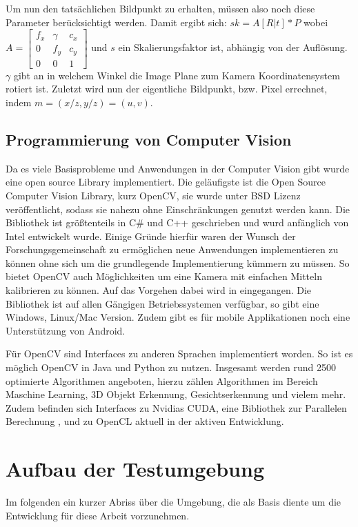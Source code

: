 Um nun den tatsächlichen Bildpunkt zu erhalten, müssen also noch diese Parameter berücksichtigt werden. Damit ergibt sich:
$sk = A [R | t] * P 
$
wobei $A = \begin{bmatrix} f_x & \gamma & c_x \\
                             0 &  f_y   & c_y \\
                             0 &  0     &  1\end{bmatrix}$ und $s$ ein Skalierungsfaktor ist, abhängig von der Auflösung. $\gamma$ gibt an in welchem Winkel die Image Plane zum Kamera Koordinatensystem rotiert ist. Zuletzt wird nun der eigentliche Bildpunkt, bzw. Pixel errechnet, indem $m=(x/z, y/z)=(u,v)$.



\subsection{Programmierung von Computer Vision}
\label{sec:opencv}
Da es viele Basisprobleme und Anwendungen in der Computer Vision gibt wurde eine open source Library implementiert. Die geläufigste ist die Open Source Computer Vision Library, kurz OpenCV, sie wurde unter BSD Lizenz veröffentlicht, sodass sie nahezu ohne Einschränkungen genutzt werden kann. Die Bibliothek ist größtenteils in C\# und C++  geschrieben und wurd anfänglich von Intel entwickelt wurde. \textbf{\autocite[512--]{Medioni:2004:ETC:993884} }Einige Gründe hierfür waren der Wunsch der Forschungsgemeinschaft zu ermöglichen neue Anwendungen implementieren zu können ohne sich um die grundlegende Implementierung kümmern zu müssen. So bietet OpenCV auch Möglichkeiten um eine Kamera mit einfachen Mitteln kalibrieren zu können. Auf das Vorgehen dabei wird in  eingegangen.
Die Bibliothek ist auf allen Gängigen Betriebssystemen verfügbar, so gibt eine Windows, Linux/Mac Version. Zudem gibt es für mobile Applikationen noch eine Unterstützung von Android.

Für OpenCV sind Interfaces zu anderen Sprachen implementiert worden. So ist es möglich OpenCV in Java und Python zu nutzen. \autocite{OpenCV2016} Insgesamt werden rund 2500 optimierte Algorithmen angeboten, hierzu zählen Algorithmen im Bereich Maschine Learning, 3D Objekt Erkennung, Gesichtserkennung und vielem mehr. Zudem befinden sich Interfaces zu Nvidias CUDA, eine Bibliothek zur Parallelen Berechnung \autocite{cuda2017}, und zu OpenCL aktuell in der aktiven Entwicklung.


\section{Aufbau der Testumgebung}
\label{sec:setup}
Im folgenden ein kurzer Abriss über die Umgebung, die als Basis diente um die Entwicklung für diese Arbeit vorzunehmen. 



